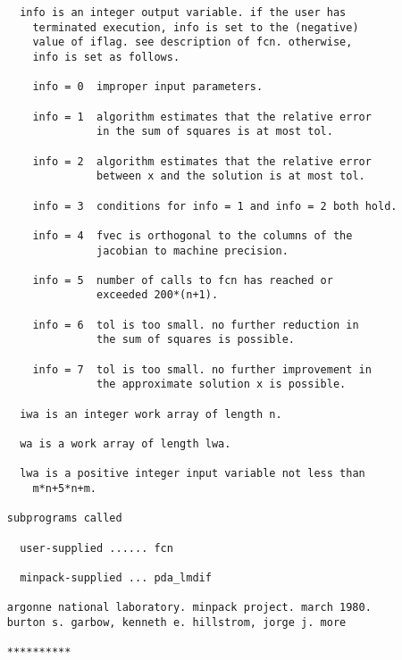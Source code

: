 \begin{verbatim}
       info is an integer output variable. if the user has
         terminated execution, info is set to the (negative)
         value of iflag. see description of fcn. otherwise,
         info is set as follows.

         info = 0  improper input parameters.

         info = 1  algorithm estimates that the relative error
                   in the sum of squares is at most tol.

         info = 2  algorithm estimates that the relative error
                   between x and the solution is at most tol.

         info = 3  conditions for info = 1 and info = 2 both hold.

         info = 4  fvec is orthogonal to the columns of the
                   jacobian to machine precision.

         info = 5  number of calls to fcn has reached or
                   exceeded 200*(n+1).

         info = 6  tol is too small. no further reduction in
                   the sum of squares is possible.

         info = 7  tol is too small. no further improvement in
                   the approximate solution x is possible.

       iwa is an integer work array of length n.

       wa is a work array of length lwa.

       lwa is a positive integer input variable not less than
         m*n+5*n+m.

     subprograms called

       user-supplied ...... fcn

       minpack-supplied ... pda_lmdif

     argonne national laboratory. minpack project. march 1980.
     burton s. garbow, kenneth e. hillstrom, jorge j. more

     **********
\end{verbatim}

